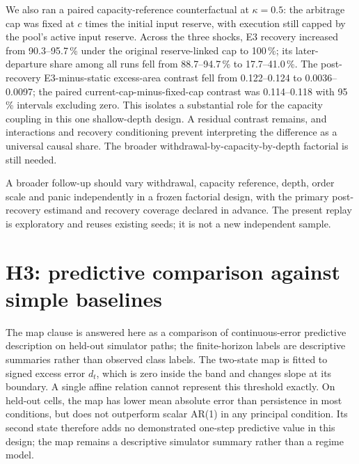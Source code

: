 We also ran a paired capacity-reference counterfactual at $\kappa=0.5$: the arbitrage cap was fixed at $c$ times the initial input reserve, with execution still capped by the pool's active input reserve. Across the three shocks, E3 recovery increased from 90.3--95.7\,\% under the original reserve-linked cap to 100\,\%; its later-departure share among all runs fell from 88.7--94.7\,\% to 17.7--41.0\,\%. The post-recovery E3-minus-static excess-area contrast fell from 0.122--0.124 to 0.0036--0.0097; the paired current-cap-minus-fixed-cap contrast was 0.114--0.118 with 95\,\% intervals excluding zero. This isolates a substantial role for the capacity coupling in this one shallow-depth design. A residual contrast remains, and interactions and recovery conditioning prevent interpreting the difference as a universal causal share. The broader withdrawal-by-capacity-by-depth factorial is still needed.

A broader follow-up should vary withdrawal, capacity reference, depth, order scale and panic independently in a frozen factorial design, with the primary post-recovery estimand and recovery coverage declared in advance. The present replay is exploratory and reuses existing seeds; it is not a new independent sample.

\section{H3: predictive comparison against simple baselines}
\label{sec:res-h3}

The map clause is answered here as a comparison of continuous-error predictive description on held-out simulator paths; the finite-horizon labels are descriptive summaries rather than observed class labels. The two-state map is fitted to signed excess error $d_t$, which is zero inside the band and changes slope at its boundary. A single affine relation cannot represent this threshold exactly. On held-out cells, the map has lower mean absolute error than persistence in most conditions, but does not outperform scalar AR(1) in any principal condition. Its second state therefore adds no demonstrated one-step predictive value in this design; the map remains a descriptive simulator summary rather than a regime model.

